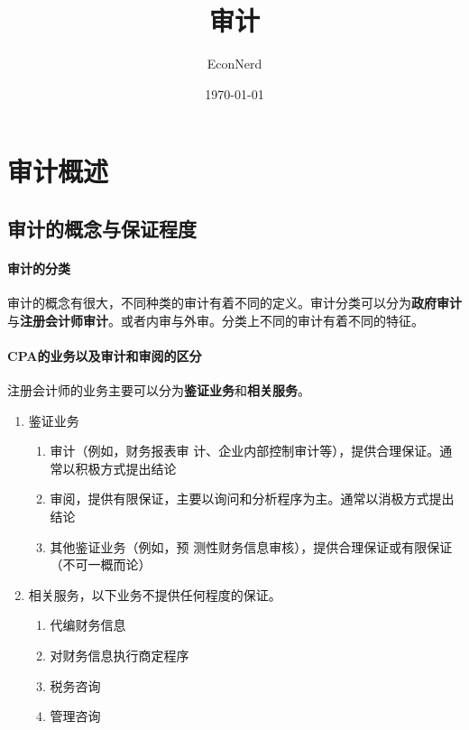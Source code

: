 \documentclass[UTF8,12pt]{ctexart}
\title{审计} %
\author{EconNerd}
\date{\today}
\numberwithin{equation}{section} %
\numberwithin{figure}{section}
\numberwithin{table}{section}
\begin{document}
	\maketitle
	\tableofcontents
	\newpage

	\section{审计概述}
	\subsection{审计的概念与保证程度}
	\paragraph{审计的分类}审计的概念有很大，不同种类的审计有着不同的定义。审计分类可以分为\textbf{政府审计}与\textbf{注册会计师审计}。或者内审与外审。分类上不同的审计有着不同的特征。
	
	\paragraph{CPA的业务以及审计和审阅的区分}注册会计师的业务主要可以分为\textbf{鉴证业务}和\textbf{相关服务}。
	\begin{enumerate}
		\item 鉴证业务
		\begin{enumerate}
			\item 审计（例如，财务报表审
			计、企业内部控制审计等），提供合理保证。通常以积极方式提出结论
			
			\item 审阅，提供有限保证，主要以询问和分析程序为主。通常以消极方式提出结论
			
			\item 其他鉴证业务（例如，预
			测性财务信息审核），提供合理保证或有限保证
			（不可一概而论）
		\end{enumerate}
		
		\item 相关服务，以下业务不提供任何程度的保证。
		\begin{enumerate}
			\item 代编财务信息
			
			\item 对财务信息执行商定程序
			
			\item 税务咨询
			
			\item 管理咨询
		\end{enumerate}
	\end{enumerate}
	
\end{document}
